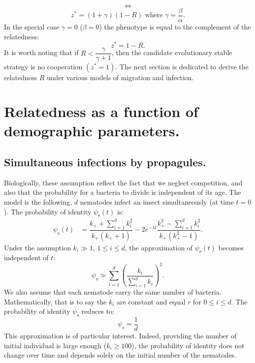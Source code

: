 \documentclass[10pt]{article}
\newcommand{\psis}{\psi_\mathrm{s}}
\begin{document}
\begin{multicols}{2}
  \begin{equation}
  \iff
  \end{equation}
  \begin{equation}
  z^*=(1+\gamma)(1-R) \text{ where }\gamma=\dfrac{\beta}{\alpha}.
  \end{equation}
  In the special case $\gamma=0$ ($\beta=0$) the phenotype is equal to the complement of the relatedness:
  \begin{equation}
  z^*=1-R.
  \end{equation} 
  It is worth noting that if $R<\dfrac{\gamma}{\gamma+1}$, then the candidate evolutionary stable strategy is no cooperation $(z^*=1)$.
  The next section is dedicated to derive the relatedness $R$ under various models of migration and infection.
\section*{Relatedness as a function of demographic parameters.}
\subsection*{Simultaneous infections by propagules.}
Biologically, these assumption reflect the fact that we neglect competition, and also that the probability for a bacteria to divide is independent of its age.
The model is the following, $d$ nematodes infect an insect simultaneously (at time $t=0$). The probability of identity $\psis(t)$ is:
\begin{align}
\psis(t) &= \dfrac{ k_+ + \sum_{i=1}^d k_i^2}{k_+ (k_+ +1)}  -2 e^{-\lambda t} \dfrac{ k_+^2-\sum_{i=1}^d k_i^2}{k_+ (k_+^2 -1) }. 
\end{align}
Under the assumption $k_i \gg 1$, $ 1 \leq i \leq d $, the approximation of $\psis(t)$ becomes independent of $t$:
 \begin{equation}
\psis \simeq \displaystyle \sum_{i=1}^d \left( \dfrac{ k_i}{\sum_{i=1}^d k_i} \right)^2.
 \end{equation}
We also assume that each nematode carry the same number of bacteria. Mathematically, that is to say the $k_i$ are constant and equal $r$ for $0 \leq i \leq d$. The probability of identity $\psis$ reduces to:
\begin{equation}
\psis = \dfrac{1}{d}
\end{equation}
 This approximation is of particular interest. Indeed, providing the number of initial individual is large enough ($k_i \geq 100$), the probability of identity does not change over time and depends solely on the initial number of the nematodes. 
 \end{multicols}
\end{document}
